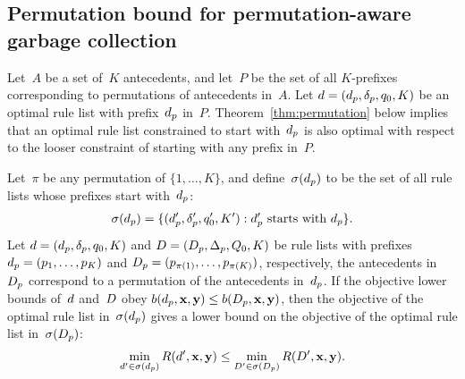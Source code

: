 \subsection{Permutation bound for permutation-aware garbage collection}
\label{sec:permutation}

Let~$A$ be a set of~$K$ antecedents, and let~$P$ be the set of all
$K$-prefixes corresponding to permutations of antecedents in~$A$.
%
Let ${{d} = (d_p, \delta_p, q_0, K)}$ be an optimal rule list
with prefix~$d_p$ in~$P$.
%
Theorem~\ref{thm:permutation} below implies that
an optimal rule list constrained to start with~$d_p$
is also optimal with respect to the looser constraint of
starting with any prefix in~$P$.

\begin{theorem}
\label{thm:permutation}
Let~$\pi$ be any permutation of ${\{1, \dots, K\}}$,
and define~$\sigma(d_p)$ to be the set of all rule lists
whose prefixes start with~$d_p$:
\begin{align}
\StartsWith(\Prefix) =
\{(\Prefix', \Labels', \Default', K') : \Prefix' \textnormal{ starts with } \Prefix \}.
\end{align}
Let ${{d} = (d_p, \delta_p, q_0, K)}$
and ${{D} = (D_p, \Delta_p, Q_0, K)}$
be rule lists with prefixes ${d_p = (p_1, \dots, p_K)}$
and ${D_p = (p_{\pi(1)}, \dots, p_{\pi(K)})}$,
respectively, \ie the antecedents in~$D_p$
correspond to a permutation of the antecedents in~$d_p$.
%
If the objective lower bounds of~${d}$ and~${D}$
obey ${b(d_p, \mathbf{x}, \mathbf{y}) \le b(D_p, \mathbf{x}, \mathbf{y})}$,
then the objective of the optimal rule list in~$\sigma(d_p)$ gives a
lower bound on the objective of the optimal rule list in~$\sigma(D_p)$:
\begin{align}
\min_{\RL' \in \StartsWith(\Prefix)} \Obj(\RL', \x, \y)
\le \min_{\RLB' \in \StartsWith(\PrefixB)} \Obj(\RLB', \x, \y).
\label{eq:permutation}
\end{align}
\end{theorem}

